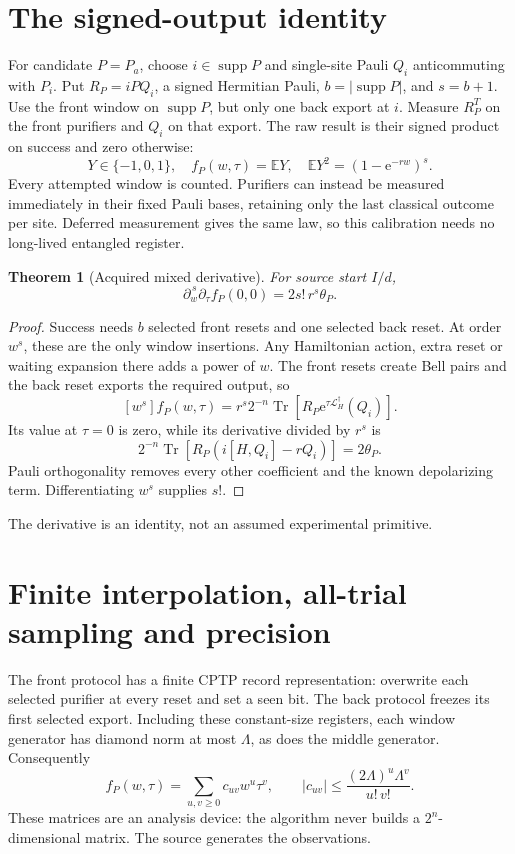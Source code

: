 \documentclass[11pt]{article}
\newtheorem{theorem}{Theorem}
\newcommand{\Tr}{\operatorname{Tr}}
\newcommand{\supp}{\operatorname{supp}}
\newcommand{\cL}{\mathcal L}
\newcommand{\ee}{\mathrm e}
\begin{document}
\section{The signed-output identity}
For candidate \(P=P_a\), choose \(i\in\supp P\) and single-site Pauli \(Q_i\)
anticommuting with \(P_i\). Put \(R_P=iPQ_i\), a signed Hermitian Pauli,
\(b=|\supp P|\), and \(s=b+1\). Use the front window on \(\supp P\), but only
one back export at \(i\). Measure \(R_P^T\) on the front purifiers and \(Q_i\)
on that export. The raw result is their signed product on success and zero
otherwise:
\[
Y\in\{-1,0,1\},\quad f_P(w,\tau)=\mathbb EY,\quad
\mathbb EY^2=(1-\ee^{-rw})^s.
\]
Every attempted window is counted. Purifiers can instead be measured immediately
in their fixed Pauli bases, retaining only the last classical outcome per site.
Deferred measurement gives the same law, so this calibration needs no long-lived
entangled register.

\begin{theorem}[Acquired mixed derivative]
For source start \(I/d\),
\begin{equation}
\boxed{\partial_w^{\,s}\partial_\tau f_P(0,0)=2s!\,r^s\theta_P.}
\label{eq:identity}
\end{equation}
\end{theorem}
\begin{proof}
Success needs \(b\) selected front resets and one selected back reset. At order
\(w^s\), these are the only window insertions. Any Hamiltonian action, extra reset
or waiting expansion there adds a power of \(w\). The front resets create Bell
pairs and the back reset exports the required output, so
\[
[w^s]f_P(w,\tau)
=r^s2^{-n}\Tr[R_P\ee^{\tau\cL_H^\dagger}(Q_i)].
\]
Its value at \(\tau=0\) is zero, while its derivative divided by \(r^s\) is
\[
2^{-n}\Tr[R_P(i[H,Q_i]-rQ_i)]=2\theta_P.
\]
Pauli orthogonality removes every other coefficient and the known depolarizing
term. Differentiating \(w^s\) supplies \(s!\).
\end{proof}
The derivative is an identity, not an assumed experimental primitive.

\section{Finite interpolation, all-trial sampling and precision}
The front protocol has a finite CPTP record representation: overwrite each
selected purifier at every reset and set a seen bit. The back protocol freezes
its first selected export. Including these constant-size registers, each
window generator has diamond norm at most \(\Lambda\), as does the middle
generator. Consequently
\begin{equation}
f_P(w,\tau)=\sum_{u,v\ge0}c_{uv}w^u\tau^v,\qquad
|c_{uv}|\le\frac{(2\Lambda)^u\Lambda^v}{u!\,v!}.
\label{eq:analytic}
\end{equation}
These matrices are an analysis device: the algorithm never builds a
\(2^n\)-dimensional matrix. The source generates the observations.
\end{document}
